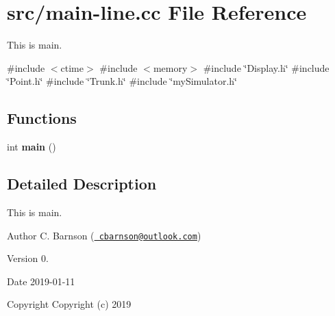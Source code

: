 \hypertarget{main-line_8cc}{}\section{src/main-\/line.cc File Reference}
\label{main-line_8cc}


This is main.  


{\ttfamily \#include $<$ctime$>$}\newline
{\ttfamily \#include $<$memory$>$}\newline
{\ttfamily \#include \char`\"{}Display.\+h\char`\"{}}\newline
{\ttfamily \#include \char`\"{}Point.\+h\char`\"{}}\newline
{\ttfamily \#include \char`\"{}Trunk.\+h\char`\"{}}\newline
{\ttfamily \#include \char`\"{}my\+Simulator.\+h\char`\"{}}\newline
\subsection*{Functions}
\begin{DoxyCompactItemize}
\item 
\mbox{\label{main-line_8cc_ae66f6b31b5ad750f1fe042a706a4e3d4}} 
int {\bfseries main} ()
\end{DoxyCompactItemize}


\subsection{Detailed Description}
This is main. 

\begin{DoxyAuthor}{Author}
C. Barnson (\href{mailto:cbarnson@outlook.com}{\texttt{ cbarnson@outlook.\+com}}) 
\end{DoxyAuthor}
\begin{DoxyVersion}{Version}
0. 
\end{DoxyVersion}
\begin{DoxyDate}{Date}
2019-\/01-\/11
\end{DoxyDate}
\begin{DoxyCopyright}{Copyright}
Copyright (c) 2019 
\end{DoxyCopyright}
